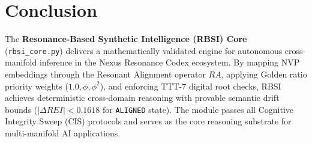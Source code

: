 \section{Conclusion}
The \textbf{Resonance-Based Synthetic Intelligence (RBSI) Core} (\texttt{rbsi\_core.py}) delivers a mathematically validated engine for autonomous cross-manifold inference in the Nexus Resonance Codex ecosystem. By mapping NVP embeddings through the Resonant Alignment operator $RA$, applying Golden ratio priority weights ($1.0, \phi, \phi^2$), and enforcing TTT-7 digital root checks, RBSI achieves deterministic cross-domain reasoning with provable semantic drift bounds ($|\Delta REI| < 0.1618$ for \texttt{ALIGNED} state). The module passes all Cognitive Integrity Sweep (CIS) protocols and serves as the core reasoning substrate for multi-manifold AI applications.
